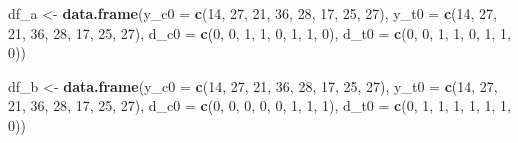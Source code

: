 \documentclass[12pt,leqno]{article}
\newenvironment{Shaded}{\begin{snugshade}}{\end{snugshade}}
\newcommand{\DataTypeTok}[1]{\textcolor[rgb]{0.13,0.29,0.53}{#1}}
\newcommand{\DecValTok}[1]{\textcolor[rgb]{0.00,0.00,0.81}{#1}}
\newcommand{\KeywordTok}[1]{\textcolor[rgb]{0.13,0.29,0.53}{\textbf{#1}}}
\newcommand{\NormalTok}[1]{#1}
\newcommand{\StringTok}[1]{\textcolor[rgb]{0.31,0.60,0.02}{#1}}
\theoremstyle{newstyle}
\begin{document}
\begin{Shaded}
\begin{Highlighting}[]
\NormalTok{df_a <-}\StringTok{ }\KeywordTok{data.frame}\NormalTok{(}\DataTypeTok{y_c0 =} \KeywordTok{c}\NormalTok{(}\DecValTok{14}\NormalTok{, }\DecValTok{27}\NormalTok{, }\DecValTok{21}\NormalTok{, }\DecValTok{36}\NormalTok{, }\DecValTok{28}\NormalTok{, }\DecValTok{17}\NormalTok{, }\DecValTok{25}\NormalTok{, }\DecValTok{27}\NormalTok{),}
                   \DataTypeTok{y_t0 =} \KeywordTok{c}\NormalTok{(}\DecValTok{14}\NormalTok{, }\DecValTok{27}\NormalTok{, }\DecValTok{21}\NormalTok{, }\DecValTok{36}\NormalTok{, }\DecValTok{28}\NormalTok{, }\DecValTok{17}\NormalTok{, }\DecValTok{25}\NormalTok{, }\DecValTok{27}\NormalTok{),}
                   \DataTypeTok{d_c0 =} \KeywordTok{c}\NormalTok{(}\DecValTok{0}\NormalTok{, }\DecValTok{0}\NormalTok{, }\DecValTok{1}\NormalTok{, }\DecValTok{1}\NormalTok{, }\DecValTok{0}\NormalTok{, }\DecValTok{1}\NormalTok{, }\DecValTok{1}\NormalTok{, }\DecValTok{0}\NormalTok{),}
                   \DataTypeTok{d_t0 =} \KeywordTok{c}\NormalTok{(}\DecValTok{0}\NormalTok{, }\DecValTok{0}\NormalTok{, }\DecValTok{1}\NormalTok{, }\DecValTok{1}\NormalTok{, }\DecValTok{0}\NormalTok{, }\DecValTok{1}\NormalTok{, }\DecValTok{1}\NormalTok{, }\DecValTok{0}\NormalTok{))}

\NormalTok{df_b <-}\StringTok{ }\KeywordTok{data.frame}\NormalTok{(}\DataTypeTok{y_c0 =} \KeywordTok{c}\NormalTok{(}\DecValTok{14}\NormalTok{, }\DecValTok{27}\NormalTok{, }\DecValTok{21}\NormalTok{, }\DecValTok{36}\NormalTok{, }\DecValTok{28}\NormalTok{, }\DecValTok{17}\NormalTok{, }\DecValTok{25}\NormalTok{, }\DecValTok{27}\NormalTok{),}
                   \DataTypeTok{y_t0 =} \KeywordTok{c}\NormalTok{(}\DecValTok{14}\NormalTok{, }\DecValTok{27}\NormalTok{, }\DecValTok{21}\NormalTok{, }\DecValTok{36}\NormalTok{, }\DecValTok{28}\NormalTok{, }\DecValTok{17}\NormalTok{, }\DecValTok{25}\NormalTok{, }\DecValTok{27}\NormalTok{),}
                   \DataTypeTok{d_c0 =} \KeywordTok{c}\NormalTok{(}\DecValTok{0}\NormalTok{, }\DecValTok{0}\NormalTok{, }\DecValTok{0}\NormalTok{, }\DecValTok{0}\NormalTok{, }\DecValTok{0}\NormalTok{, }\DecValTok{1}\NormalTok{, }\DecValTok{1}\NormalTok{, }\DecValTok{1}\NormalTok{),}
                   \DataTypeTok{d_t0 =} \KeywordTok{c}\NormalTok{(}\DecValTok{0}\NormalTok{, }\DecValTok{1}\NormalTok{, }\DecValTok{1}\NormalTok{, }\DecValTok{1}\NormalTok{, }\DecValTok{1}\NormalTok{, }\DecValTok{1}\NormalTok{, }\DecValTok{1}\NormalTok{, }\DecValTok{0}\NormalTok{))}


\end{Highlighting}
\end{Shaded}
\end{document}
